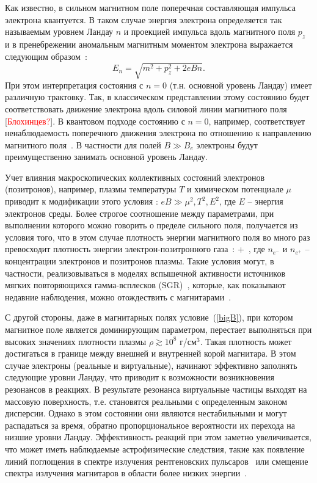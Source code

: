 Как известно, в сильном магнитном поле поперечная составляющая импульса электрона квантуется. В таком случае энергия электрона определяется так называемым уровнем Ландау $n$ и проекцией импульса вдоль магнитного поля $p_z$ и в пренебрежении аномальным магнитным моментом электрона выражается следующим образом~\cite{Sokolov:1968}: 
\begin{equation}
E_n = \sqrt{m^2+p_z^2+2 e B n}.
\end{equation}
%
При этом интерпретация состояния с $n=0$ (т.н. основной уровень Ландау) имеет 
различную трактовку. Так, в классическом представлении этому состоянию будет 
соответствовать движение электрона вдоль силовой линии магнитного поля 
[\textcolor{red}{Блохинцев?}]. В квантовом подходе состоянию с $n=0$, например, 
соответствует ненаблюдаемость поперечного движения электрона по отношению к 
направлению магнитного поля~\cite{KM_Book_2013}. В частности для полей $B\gg 
B_e$ электроны будут преимущественно занимать основной уровень Ландау. 

Учет влияния макроскопических коллективных состояний электронов (позитронов), например, плазмы температуры $T$ и химическом потенциале $\mu$ приводит к модификации этого условия \cite{Borisov:1997}: $eB \gg \mu^2, T^2, E^2$, где $E$ -- энергия электронов среды. Более строгое соотношение между параметрами, при выполнении которого можно говорить о пределе сильного поля, получается из условия того, что в этом случае плотность энергии магнитного поля во много раз превосходит плотность энергии электрон-позитронного газа~\cite{KuzMih:2000}: 
%
\beq
\label{bigB}
 \gg {} + \,,
\eeq 
%
\noindent где $n_{e^{-}}$ и $n_{e^{+}}$ -- концентрации электронов и позитронов плазмы. Такие условия могут, в частности, реализовываться в моделях вспышечной активности источников мягких повторяющихся гамма-всплесков 
(SGR)~\cite{Duncan:1995, Bisnovatyi:1979}, которые, как показывают недавние наблюдения, можно отождествить с магнитарами~\cite{Kouveliotou:1998ze,Kouveliotou:1998fd,Gavriil:2002mc,Ibrahim:2002zw,Ibrahim:2002zy,Olausen:2014}.

С другой стороны, даже в магнитарных полях условие~(\ref{bigB}), при котором 
магнитное поле является доминирующим параметром, перестает выполняться при 
высоких значениях плотности плазмы $\rho \gtrsim 10^8$ г/см$^3$. Такая 
плотность может достигаться в  границе между внешней и внутренней корой 
магнитара. В этом случае электроны (реальные и виртуальные), начинают 
эффективно заполнять следующие уровни Ландау, что приводит к возможности 
возникновения резонансов в реакциях.
 В результате резонанса виртуальные частицы выходят на массовую поверхность, т.е. становятся реальными с определенным законом дисперсии. 
Однако в этом состоянии они являются нестабильными и могут распадаться за время, обратно пропорциональное вероятности их перехода на низшие уровни Ландау. Эффективность реакций при этом заметно увеличивается, что 
может иметь наблюдаемые астрофизические следствия, такие как появление линий 
поглощения в спектре излучения рентгеновских пульсаров~\cite{Truemper1978} или 
смещение спектра излучения магнитаров в области более низких 
энергии~\cite{Lyutikov:2002}.

